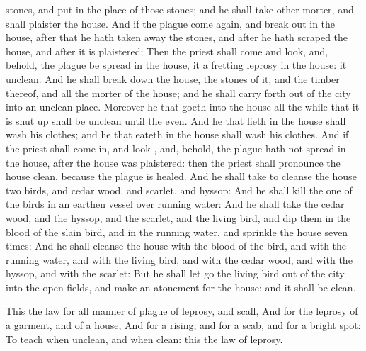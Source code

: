 {stones, and
put
{} in the
place of those
stones; and he shall
take
other
morter, and shall
plaister the
house.
And if the
plague come
again, and
break out in the
house,
after that he hath
taken away the
stones, and
after he hath
scraped the
house, and
after it is
plaistered;
Then the
priest shall
come and
look, and, behold,
{} the
plague be
spread in the
house, it
{} a
fretting
leprosy in the
house: it
{}
unclean.
And he shall break
down the
house, the
stones of it, and the
timber thereof, and all the
morter of the
house; and he shall carry
{}
forth
out of the
city into an
unclean
place.
Moreover he that
goeth into the
house all the
while that it is
shut up shall be
unclean until the
even.
And he that
lieth in the
house shall
wash his
clothes; and he that
eateth in the
house shall
wash his
clothes.
And if the
priest shall come
in, and
look
{}, and, behold, the
plague hath not
spread in the
house,
after the
house was
plaistered: then the
priest shall pronounce the
house
clean, because the
plague is
healed.
And he shall
take to
cleanse the
house
two
birds, and
cedar
wood, and
scarlet, and
hyssop:
And he shall
kill the
one of the
birds in an
earthen
vessel over
running
water:
And he shall
take the
cedar
wood, and the
hyssop, and the
scarlet, and the
living
bird, and
dip them in the
blood of the
slain
bird, and in the
running
water, and
sprinkle the
house
seven
times:
And he shall
cleanse the
house with the
blood of the
bird, and with the
running
water, and with the
living
bird, and with the
cedar
wood, and with the
hyssop, and with the
scarlet:
But he shall let
go the
living
bird
out of the
city into the
open
fields, and make an
atonement for the
house: and it shall be
clean.
\par }{\PP {}This
{} the
law for all manner of
plague of
leprosy, and
scall,
And for the
leprosy of a
garment, and of a
house,
And for a
rising, and for a
scab, and for a bright
spot:
To
teach
when
{}
unclean, and
when
{}
clean: this
{} the
law of
leprosy.

}
